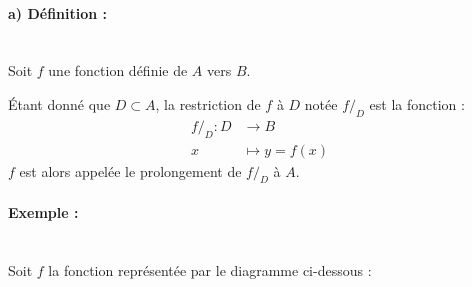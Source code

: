 \documentclass[12pt,a4paper]{article}
\begin{document}
\paragraph{\color{darkred}a) Définition :}~\\

Soit $f$ une fonction définie de $A$ vers $B$.

Étant donné que {\color{darkred}$D \subset A$}, la {\color{darkred}restriction} de $f$ à $D$ notée {\color{darkred}$f/_D$} est la fonction :
$$
\begin{aligned}
f/_D : D &\rightarrow B \\
x &\mapsto y = f(x)
\end{aligned}
$$
{\color{darkred}$f$} est alors appelée le {\color{darkred}prolongement} de $f/_D$ à $A$.

\paragraph{Exemple :}~\\
Soit $f$ la fonction représentée par le diagramme ci-dessous :
\end{document}
